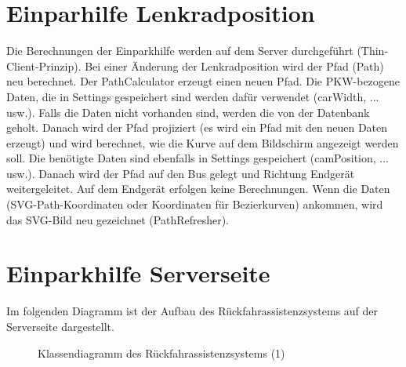 \documentclass[entwurf.tex]{subfiles}
\begin{document}
		\section{Einparhilfe Lenkradposition}
Die Berechnungen der Einparkhilfe werden auf dem Server durchgeführt (Thin-Client-Prinzip). Bei einer Änderung der Lenkradposition wird der Pfad (Path) neu berechnet. Der PathCalculator erzeugt einen neuen Pfad. Die PKW-bezogene Daten, die in Settings gespeichert sind werden dafür verwendet (carWidth, ... usw.). Falls die Daten nicht vorhanden sind, werden die von der Datenbank geholt. Danach wird der Pfad projiziert (es wird ein Pfad mit den neuen Daten erzeugt) und wird berechnet, wie die Kurve auf dem Bildschirm angezeigt werden soll. Die benötigte Daten sind ebenfalls in Settings gespeichert (camPosition, ... usw.). Danach wird der Pfad auf den Bus gelegt und Richtung Endgerät weitergeleitet. Auf dem Endgerät erfolgen keine Berechnungen. Wenn die Daten (SVG-Path-Koordinaten oder Koordinaten für Bezierkurven) ankommen, wird das SVG-Bild neu gezeichnet (PathRefresher).
  	
		\newpage
  	\section{Einparkhilfe Serverseite}
		Im folgenden Diagramm ist der Aufbau des Rückfahrassistenzsystems auf der Serverseite dargestellt.
		\begin{figure}[H]
  			\caption{Klassendiagramm des Rückfahrassistenzsystems (1)}
  		\end{figure}
  		
\end{document}
